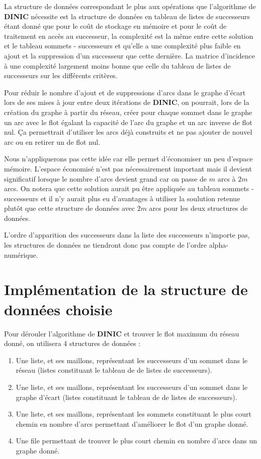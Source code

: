 \documentclass[11pt, a4paper]{report}
\begin{document}
    La structure de données correspondant le plus aux opérations que l'algorithme de \textbf{DINIC} nécessite est la structure de données en tableau de listes de successeurs étant donné que pour le coût de stockage en mémoire et pour le coût de traitement en accès au successeur, la complexité est la même entre cette solution et le tableau sommets - successeurs et qu'elle a une complexité plus faible en ajout et la suppression d'un successeur que cette dernière. La matrice d'incidence à une complexité largement moins bonne que celle du tableau de listes de successeurs sur les différents critères.
    
    Pour réduir le nombre d'ajout et de suppressions d'arcs dans le graphe d'écart lors de ses mises à jour entre deux itérations de \textbf{DINIC}, on pourrait, lors de la création du graphe à partir du réseau, créer pour chaque sommet dans le graphe un arc avec le flot égalant la capacité de l'arc du graphe et un arc inverse de flot nul. Ça permettrait d'utiliser les arcs déjà construits et ne pas ajouter de nouvel arc ou en retirer un de flot nul.
    
    Nous n'appliquerons pas cette idée car elle permet d'économiser un peu d'espace mémoire. L'espace économisé n'est pas nécessairement important mais il devient significatif lorsque le nombre d'arcs devient grand car on passe de $m$ arcs à $2m$ arcs. On notera que cette solution aurait pu être appliquée au tableau sommets - successeurs et il n'y aurait plus eu d'avantages à utiliser la soulution retenue plutôt que cette structure de données avec $2m$ arcs pour les deux structures de données.
    
    L'ordre d'apparition des successeurs dans la liste des successeurs n'importe pas, les structures de données ne tiendront donc pas compte de l'ordre alpha-numérique.
    
	\section{Implémentation de la structure de données choisie}
	
	Pour dérouler l'algorithme de \textbf{DINIC} et trouver le flot maximum du réseau donné, on utilisera 4 structures de données : 
	\begin{enumerate}
		\item Une liste, et ses maillons, représentant les successeurs d'un sommet dans le réseau (listes constituant le tableau de de listes de successeurs).
		\item Une liste, et ses maillons, représentant les successeurs d'un sommet dans le graphe d'écart (listes constituant le tableau de de listes de successeurs).
		\item Une liste, et ses maillons, représentant les sommets constituant le plus court chemin en nombre d'arcs permettant d'améliorer le flot d'un graphe donné.
		\item Une file permettant de trouver le plus court chemin en nombre d'arcs dans un graphe donné.
	\end{enumerate}
	
\end{document}

